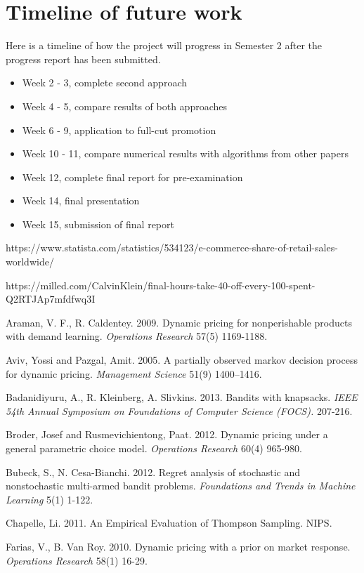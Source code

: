 \documentclass[a4paper]{article}
\begin{document}
\section{Timeline of future work}
Here is a timeline of how the project will progress in Semester 2 after the progress report has been submitted. 
\begin{itemize}
	\item Week 2 - 3, complete second approach
	\item Week 4 - 5, compare results of both approaches
	\item Week 6 - 9, application to full-cut promotion
	\item Week 10 - 11, compare numerical results with algorithms from other papers
	\item Week 12, complete final report for pre-examination
	\item Week 14, final presentation
	\item Week 15, submission of final report
\end{itemize}
\begin{thebibliography}{9}
	https://www.statista.com/statistics/534123/e-commerce-share-of-retail-sales-worldwide/
	
	https://milled.com/CalvinKlein/final-hours-take-40-off-every-100-spent-Q2RTJAp7mfdfwq3I
	
	Araman, V. F., R. Caldentey. 2009. Dynamic pricing for nonperishable products with demand learning.
	\emph{Operations Research} 57(5) 1169-1188.
	
	Aviv, Yossi and Pazgal, Amit. 2005. A partially observed markov decision process for dynamic
	pricing. \emph{Management Science} 51(9) 1400–1416.
	
	Badanidiyuru, A., R. Kleinberg, A. Slivkins. 2013. Bandits with knapsacks. \emph{IEEE 54th Annual Symposium on Foundations of Computer Science (FOCS).} 207-216.	
	
	Broder, Josef and Rusmevichientong, Paat. 2012. Dynamic pricing under a general parametric choice model. \emph{Operations Research} 60(4) 965-980.
	
	Bubeck, S., N. Cesa-Bianchi. 2012. Regret analysis of stochastic and nonstochastic multi-armed bandit problems. \emph{Foundations and Trends in Machine Learning} 5(1) 1-122.
	
	Chapelle,  Li. 2011. An Empirical Evaluation of Thompson Sampling. NIPS. 
	
	Farias, V., B. Van Roy. 2010. Dynamic pricing with a prior on market response. \emph{Operations Research} 58(1) 16-29.
\end{thebibliography}
\end{document}
